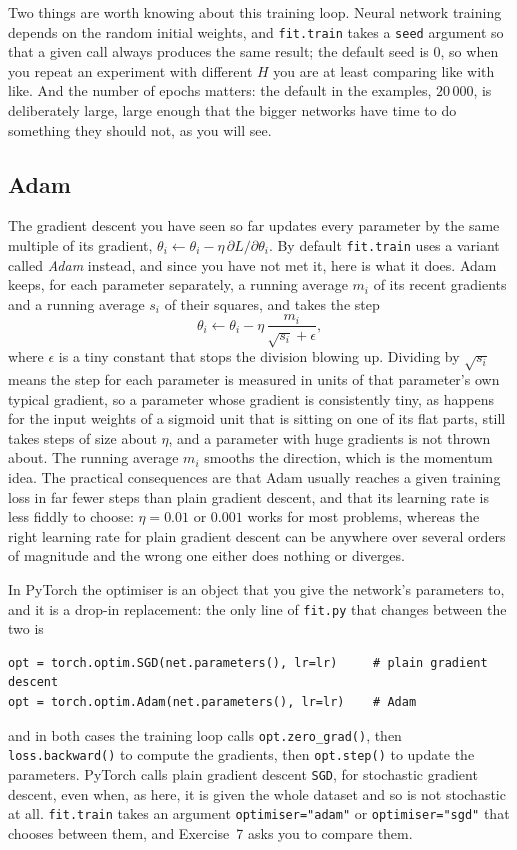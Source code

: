 \documentclass[11pt,a4paper]{article}
\begin{document}
Two things are worth knowing about this training loop. Neural network training depends on the random initial weights, and \texttt{fit.train} takes a \texttt{seed} argument so that a given call always produces the same result; the default seed is 0, so when you repeat an experiment with different $H$ you are at least comparing like with like. And the number of epochs matters: the default in the examples, $20\,000$, is deliberately large, large enough that the bigger networks have time to do something they should not, as you will see.

\subsection*{Adam}

The gradient descent you have seen so far updates every parameter by the same multiple of its gradient, $\theta_i \leftarrow \theta_i - \eta\, \partial L/\partial\theta_i$. By default \texttt{fit.train} uses a variant called \emph{Adam} instead, and since you have not met it, here is what it does. Adam keeps, for each parameter separately, a running average $m_i$ of its recent gradients and a running average $s_i$ of their squares, and takes the step
\[
\theta_i \leftarrow \theta_i - \eta\,\frac{m_i}{\sqrt{s_i} + \epsilon},
\]
where $\epsilon$ is a tiny constant that stops the division blowing up. Dividing by $\sqrt{s_i}$ means the step for each parameter is measured in units of that parameter's own typical gradient, so a parameter whose gradient is consistently tiny, as happens for the input weights of a sigmoid unit that is sitting on one of its flat parts, still takes steps of size about $\eta$, and a parameter with huge gradients is not thrown about. The running average $m_i$ smooths the direction, which is the momentum idea. The practical consequences are that Adam usually reaches a given training loss in far fewer steps than plain gradient descent, and that its learning rate is less fiddly to choose: $\eta = 0.01$ or $0.001$ works for most problems, whereas the right learning rate for plain gradient descent can be anywhere over several orders of magnitude and the wrong one either does nothing or diverges.

In PyTorch the optimiser is an object that you give the network's parameters to, and it is a drop-in replacement: the only line of \texttt{fit.py} that changes between the two is
\begin{lstlisting}
opt = torch.optim.SGD(net.parameters(), lr=lr)     # plain gradient descent
opt = torch.optim.Adam(net.parameters(), lr=lr)    # Adam
\end{lstlisting}
and in both cases the training loop calls \texttt{opt.zero\_grad()}, then \texttt{loss.backward()} to compute the gradients, then \texttt{opt.step()} to update the parameters. PyTorch calls plain gradient descent \texttt{SGD}, for stochastic gradient descent, even when, as here, it is given the whole dataset and so is not stochastic at all. \texttt{fit.train} takes an argument \texttt{optimiser="adam"} or \texttt{optimiser="sgd"} that chooses between them, and Exercise~7 asks you to compare them.
\end{document}
